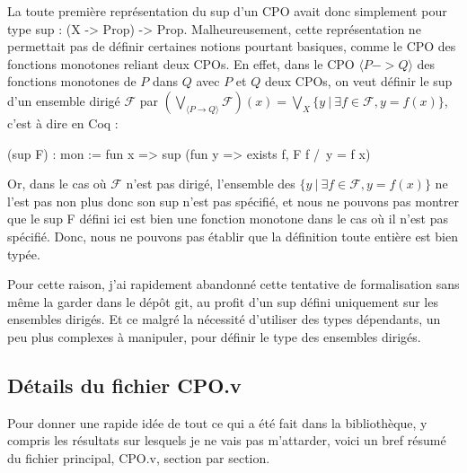 \documentclass{article}
\newcommand\code[1]{{\fontfamily{lmtt}\selectfont #1}}
\theoremstyle{definition}
\begin{document}
La toute première représentation du sup d'un CPO avait donc simplement pour type \code{sup : (X -> Prop) -> Prop}. Malheureusement, cette représentation ne permettait pas de définir certaines notions pourtant basiques, comme le CPO des fonctions monotones reliant deux CPOs. En effet, dans le CPO $\langle P -> Q \rangle$ des fonctions monotones de $P$ dans $Q$ avec $P$ et $Q$ deux CPOs, on veut définir le sup d'un ensemble dirigé $\mathcal{F}$ par $(\bigvee_{\langle P \rightarrow Q \rangle} \mathcal{F})(x) = \bigvee_{X} \{y ~ | ~ \exists f \in \mathcal{F}, y = f(x)\}$, c'est à dire en Coq :

\begin{coq}
(sup F) : mon := fun x => sup (fun y => exists f, F f /\ y = f x)
\end{coq}

Or, dans le cas où $\mathcal{F}$ n'est pas dirigé, l'ensemble des $\{y ~ | ~ \exists f \in \mathcal{F}, y = f(x)\}$ ne l'est pas non plus donc son sup n'est pas spécifié, et nous ne pouvons pas montrer que le \code{sup F} défini ici est bien une fonction monotone dans le cas où il n'est pas spécifié. Donc, nous ne pouvons pas établir que la définition toute entière est bien typée.

Pour cette raison, j'ai rapidement abandonné cette tentative de formalisation sans même la garder dans le dépôt git, au profit d'un sup défini uniquement sur les ensembles dirigés. Et ce malgré la nécessité d'utiliser des types dépendants, un peu plus complexes à manipuler, pour définir le type des ensembles dirigés.



\subsection{Détails du fichier CPO.v}

Pour donner une rapide idée de tout ce qui a été fait dans la bibliothèque, y compris les résultats sur lesquels je ne vais pas m'attarder, voici un bref résumé du fichier principal, \code{CPO.v}, section par section.

\medskip
\end{document}

